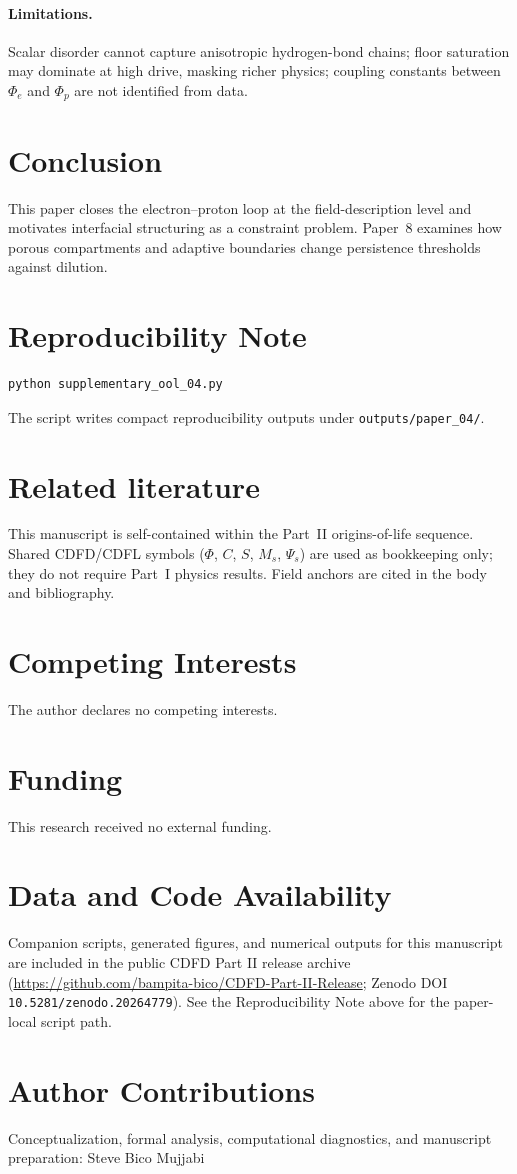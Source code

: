 \documentclass[11pt,a4paper]{article}
\begin{document}
\paragraph{Limitations.}
Scalar disorder cannot capture anisotropic hydrogen-bond chains; floor saturation may dominate at high drive, masking richer physics; coupling constants between $\Phi_e$ and $\Phi_p$ are not identified from data.

\section{Conclusion}
This paper closes the electron--proton loop at the field-description level and motivates interfacial structuring as a constraint problem. Paper~8 examines how porous compartments and adaptive boundaries change persistence thresholds against dilution.

\section{Reproducibility Note}
\begin{verbatim}
python supplementary_ool_04.py
\end{verbatim}
The script writes compact reproducibility outputs under \texttt{outputs/paper\_04/}.

\section*{Related literature}
This manuscript is self-contained within the Part~II origins-of-life sequence. Shared CDFD/CDFL symbols ($\Phi$, $C$, $S$, $M_s$, $\Psi_s$) are used as bookkeeping only; they do not require Part~I physics results. Field anchors are cited in the body and bibliography.

\section*{Competing Interests}
The author declares no competing interests.

\section*{Funding}
This research received no external funding.

\section*{Data and Code Availability}
Companion scripts, generated figures, and numerical outputs for this manuscript are included in the public CDFD Part II release archive (\url{https://github.com/bampita-bico/CDFD-Part-II-Release}; Zenodo DOI \texttt{10.5281/zenodo.20264779}). See the Reproducibility Note above for the paper-local script path.

\section*{Author Contributions}
Conceptualization, formal analysis, computational diagnostics, and manuscript preparation: Steve Bico Mujjabi



\end{document}
